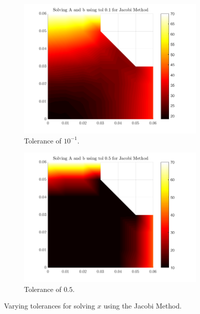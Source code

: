 \documentclass[12pt,a4paper]{article}
\begin{document}
\begin{figure}[H]
\begin{subfigure}[b]{0.48\textwidth}
		\centering
		\includegraphics[width=\linewidth]{images/JacobiComparisontol0-1.png}
		\caption{Tolerance of $10^{-1}$.}
		\label{fig:Jacobitol0.1}
	\end{subfigure}
	\hfill
	\begin{subfigure}[b]{0.48\textwidth}
		\centering
		\includegraphics[width=\linewidth]{images/JacobiComparisontol0-5.png}
		\caption{Tolerance of $0.5$.}
		\label{fig:Jacobitol0.5}
	\end{subfigure}
	\caption{Varying tolerances for solving $x$ using the Jacobi Method.}
    \label{fig:Jacobitolerance}
\end{figure}
\end{document}
